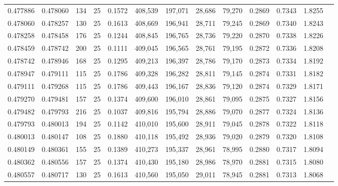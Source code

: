 \begin{tabular}{rrrrrrrrrrrrr}
0.477886 & 0.478060 &   134 &  25 &                                     0.1572 & 408,539 & 197,071 &  28,686 &  79,270 & 0.2869 & 0.7343 & 1.8255 \\
0.478060 & 0.478257 &   130 &  25 &                                     0.1613 & 408,669 & 196,941 &  28,711 &  79,245 & 0.2869 & 0.7340 & 1.8243 \\
0.478258 & 0.478458 &   176 &  25 &                                     0.1244 & 408,845 & 196,765 &  28,736 &  79,220 & 0.2870 & 0.7338 & 1.8226 \\
0.478459 & 0.478742 &   200 &  25 &                                     0.1111 & 409,045 & 196,565 &  28,761 &  79,195 & 0.2872 & 0.7336 & 1.8208 \\
0.478742 & 0.478946 &   168 &  25 &                                     0.1295 & 409,213 & 196,397 &  28,786 &  79,170 & 0.2873 & 0.7334 & 1.8192 \\
0.478947 & 0.479111 &   115 &  25 &                                     0.1786 & 409,328 & 196,282 &  28,811 &  79,145 & 0.2874 & 0.7331 & 1.8182 \\
0.479111 & 0.479268 &   115 &  25 &                                     0.1786 & 409,443 & 196,167 &  28,836 &  79,120 & 0.2874 & 0.7329 & 1.8171 \\
0.479270 & 0.479481 &   157 &  25 &                                     0.1374 & 409,600 & 196,010 &  28,861 &  79,095 & 0.2875 & 0.7327 & 1.8156 \\
0.479482 & 0.479793 &   216 &  25 &                                     0.1037 & 409,816 & 195,794 &  28,886 &  79,070 & 0.2877 & 0.7324 & 1.8136 \\
0.479793 & 0.480013 &   194 &  25 &                                     0.1142 & 410,010 & 195,600 &  28,911 &  79,045 & 0.2878 & 0.7322 & 1.8118 \\
0.480013 & 0.480147 &   108 &  25 &                                     0.1880 & 410,118 & 195,492 &  28,936 &  79,020 & 0.2879 & 0.7320 & 1.8108 \\
0.480149 & 0.480361 &   155 &  25 &                                     0.1389 & 410,273 & 195,337 &  28,961 &  78,995 & 0.2880 & 0.7317 & 1.8094 \\
0.480362 & 0.480556 &   157 &  25 &                                     0.1374 & 410,430 & 195,180 &  28,986 &  78,970 & 0.2881 & 0.7315 & 1.8080 \\
0.480557 & 0.480717 &   130 &  25 &                                     0.1613 & 410,560 & 195,050 &  29,011 &  78,945 & 0.2881 & 0.7313 & 1.8068 \\

\end{tabular}
